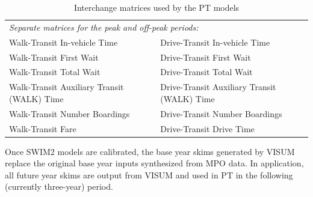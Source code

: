 \begin{table}
\centering
\caption{Interchange matrices used by the PT models}\label{tab:skims}
\begin{tabular}{ll}
\hline
\multicolumn{2}{l}{\textit{Separate matrices for the peak and off-peak periods:}} \\
Walk-Transit In-vehicle Time & Drive-Transit In-vehicle Time \\
Walk-Transit First Wait & Drive-Transit First Wait \\
Walk-Transit Total Wait & Drive-Transit Total Wait \\
Walk-Transit Auxiliary Transit (WALK) Time & Drive-Transit Auxiliary Transit (WALK) Time \\
Walk-Transit Number Boardings & Drive-Transit Number Boardings \\
Walk-Transit Fare & Drive-Transit Drive Time \\
\hline
\end{tabular}
\end{table}

Once SWIM2 models are calibrated, the base year skims generated by VISUM replace the original base year inputs synthesized from MPO data. In application, all future year skims are output from VISUM and used in PT in the following (currently three-year) period.

